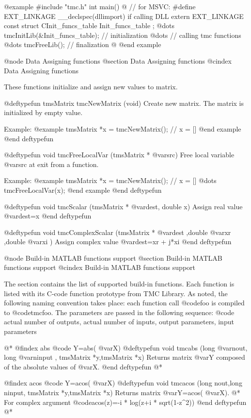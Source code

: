 @example
#include "tmc.h"
int main()
@{
// for MSVC: #define EXT_LINKAGE __declspec(dllimport) if calling DLL
extern EXT_LINKAGE const struct CInit_funcs_table Init_funcs_table ; 
@dots{}
tmcInitLib(&Init_funcs_table); // initialization
@dots{}
// calling tmc functions
@dots{}
tmcFreeLib(); // finalization
@}
@end example


@node Data Assigning functions
@section Data Assigning functions
@cindex Data Assigning functions

These functions initialize and assign new values to matrix.

@deftypefun tmsMatrix tmcNewMatrix (void)
Create new matrix. The matrix is initialized by empty value.

Example:
@example
tmsMatrix *x = tmcNewMatrix(); // x = []
@end example
@end deftypefun



@deftypefun void tmcFreeLocalVar (tmsMatrix * @var{src})
Free local variable @var{src} at exit from a function.

Example:
@example
tmsMatrix *x = tmcNewMatrix(); // x = []
@dots{}
tmcFreeLocalVar(x);
@end example
@end deftypefun

@deftypefun void tmcScalar (tmsMatrix * @var{dest}, double x)
Assign real value  @var{dest}=x
@end deftypefun

@deftypefun void tmcComplexScalar (tmsMatrix * @var{dest} ,double @var{xr} ,double @var{xi} )
Assign complex value  @var{dest}=xr + j*xi
@end deftypefun

@node Build-in MATLAB functions support
@section Build-in MATLAB functions support
@cindex Build-in MATLAB functions support

The section contains the list of supported build-in functions. Each function is listed with its C-code function prototype from TMC Library. As noted, the following naming convention takes place: each function call @code{foo} is compiled to @code{tmcfoo}. The parameters are passed in the following sequence: 
@code{
actual number of outputs, actual number of inputs, output parameters, input parameters
}

@*
@findex  abs
@code{ Y=abs( @var{X})}
@deftypefun void tmcabs (long @var{nout}, long @var{ninput} , tmsMatrix *y,tmsMatrix *x)
Returns matrix @var{Y} composed of the absolute values of @var{X}.
@end deftypefun
@*

@findex  acos
@code{ Y=acos( @var{X})}
@deftypefun void tmcacos (long nout,long ninput, tmsMatrix *y,tmsMatrix *x)
Returns matrix @var{Y}=acos( @var{X}). @*
For complex argument @code{acos(z)=-i *  log(z+i *  sqrt(1-z^2))}
@end deftypefun
@*

